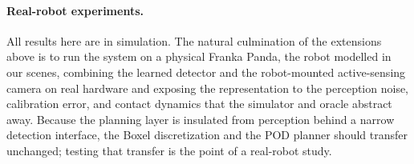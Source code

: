 \paragraph{Real-robot experiments.} All results here are in simulation. The
natural culmination of the extensions above is to run the system on a
physical Franka Panda, the robot modelled in our scenes, combining the
learned detector and the robot-mounted active-sensing camera on real
hardware and exposing the representation to the perception noise,
calibration error, and contact dynamics that the simulator and oracle
abstract away. Because the planning layer is insulated from perception
behind a narrow detection interface, the Boxel discretization and the POD
planner should transfer unchanged; testing that transfer is the point of a
real-robot study.
